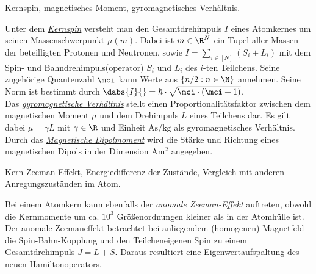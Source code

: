 \documentclass{subfiles}
\begin{document}
    \begin{Frage}
        Kernspin, magnetisches Moment, gyromagnetisches Verhältnis.
    \end{Frage}
    \begin{Antwort}
        Unter dem \href{https://de.wikipedia.org/wiki/Kernspin}{\emph{Kernspin}} versteht man den Gesamtdrehimpuls $I$ eines Atomkernes um seinen Massenschwerpunkt $\mu(m)$. Dabei ist $m\in\R^N$ ein Tupel aller Massen der beteilligten Protonen und Neutronen, sowie $I = \sum_{i\in[N]} (S_i + L_i)$ mit dem Spin- und Bahndrehimpuls(operator) $S_i$ und $L_i$ des $i$-ten Teilchens. Seine zugehörige Quantenzahl $\mci$ kann Werte aus $\{n/2:n\in\N\}$ annehmen. Seine Norm ist bestimmt durch $\dabs{I}{} = \hbar\cdot\sqrt{\mci\cdot (\mci+1)}$.\\
        
        Das \href{https://de.wikipedia.org/wiki/Gyromagnetisches_Verhältnis}{\emph{gyromagnetische Verhältnis}} stellt einen Proportionalitätsfaktor zwischen dem magnetischen Moment $\mu$ und dem Drehimpuls $L$ eines Teilchens dar. Es gilt dabei $\mu = \gamma L$ mit $\gamma\in\R$ und Einheit $\si{\ampere\second\per\kg}$ als gyromagnetisches Verhältnis.\\

        Durch das \href{https://de.wikipedia.org/wiki/Magnetisches_Dipolmoment}{\emph{Magnetische Dipolmoment}} wird die Stärke und Richtung eines magnetischen Dipols in der Dimension $\si{\ampere\metre\squared}$ angegeben. 
    \end{Antwort}


    \begin{Frage}
        Kern-Zeeman-Effekt, Energiedifferenz der Zustände, Vergleich mit anderen Anregungszuständen im Atom.
    \end{Frage}
    \begin{Antwort}
        Bei einem Atomkern kann ebenfalls der \emph{anomale Zeeman-Effekt} auftreten, obwohl die Kernmomente um ca. $10^3$ Größenordnungen kleiner als in der Atomhülle ist. Der anomale Zeemaneffekt betrachtet bei anliegendem (homogenen) Magnetfeld die Spin-Bahn-Kopplung und den Teilcheneigenen Spin zu einem Gesamtdrehimpuls $J = L + S$. Daraus resultiert eine Eigenwertaufspaltung des neuen Hamiltonoperators.
    \end{Antwort}
\end{document}

